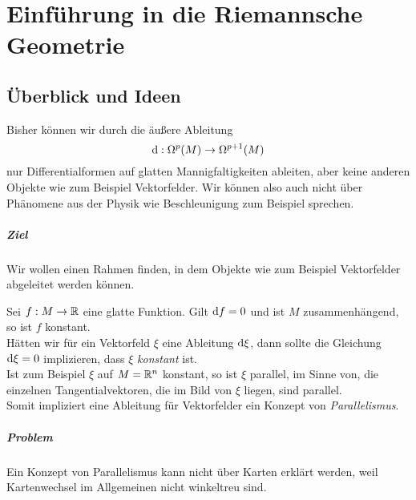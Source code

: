 
\chapter{Einführung in die Riemannsche Geometrie}
\section{Überblick und Ideen}

Bisher können wir durch die äußere Ableitung
\[ \text{d} : \Omega^p(M) \overset{}{\rightarrow} \Omega^{p+1}(M) \]
nur Differentialformen auf glatten Mannigfaltigkeiten ableiten, aber keine anderen Objekte wie zum Beispiel Vektorfelder. Wir können also auch nicht über Phänomene aus der Physik wie Beschleunigung zum Beispiel sprechen.

\paragraph{Ziel}
Wir wollen einen Rahmen finden, in dem Objekte wie zum Beispiel Vektorfelder abgeleitet werden können.

\Bsp{}
Sei $f:M \overset{}{\rightarrow} \mathbb{R}$ eine glatte Funktion. Gilt $\text{d} f = 0$ und ist $M$ zusammenhängend, so ist $f$ konstant.\\
Hätten wir für ein Vektorfeld $\xi$ eine Ableitung $\text{d} \xi$, dann sollte die Gleichung $\text{d} \xi = 0$ implizieren, dass $\xi$ \textsl{konstant} ist.\\
Ist zum Beispiel $\xi$ auf $M = \mathbb{R}^n$ konstant, so ist $\xi$ parallel, im Sinne von, die einzelnen Tangentialvektoren, die im Bild von $\xi$ liegen, sind parallel.\\
Somit impliziert eine Ableitung für Vektorfelder ein Konzept von \textsl{Parallelismus}.

\paragraph{Problem}
Ein Konzept von Parallelismus kann nicht über Karten erklärt werden, weil Kartenwechsel im Allgemeinen nicht winkeltreu sind.

